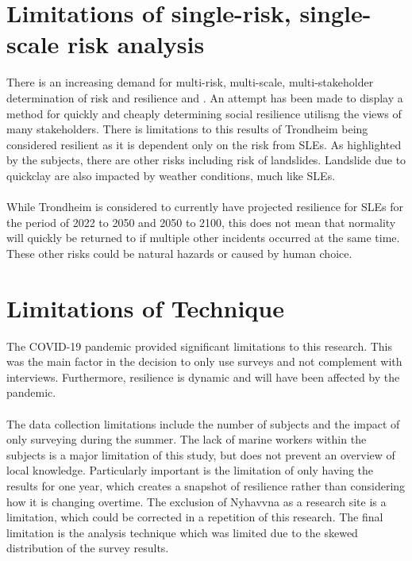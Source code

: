 \section{Limitations of single-risk, single-scale risk analysis}
There is an increasing demand for multi-risk, multi-scale, multi-stakeholder determination of risk and resilience \cite{gerkensmeier_governing_2018} and \cite{cutter_community_2020}. An attempt has been made to display a method for quickly and cheaply determining social resilience utilisng the views of many stakeholders. There is limitations to this results of Trondheim being considered resilient as it is dependent only on the risk from SLEs. As highlighted by the subjects, there are other risks including risk of landslides. Landslide due to quickclay are also impacted by weather conditions, much like SLEs. 
\paragraph{}

While Trondheim is considered to currently have projected resilience for SLEs for the period of 2022 to 2050 and 2050 to 2100, this does not mean that normality will quickly be returned to if multiple other incidents occurred at the same time. These other risks could be natural hazards or caused by human choice. 

\section{Limitations of Technique}
The COVID-19 pandemic provided significant limitations to this research. This was the main factor in the decision to only use surveys and not complement with interviews. Furthermore, resilience is dynamic and will have been affected by the pandemic. 
\paragraph{}
The data collection limitations include the number of subjects and the impact of only surveying during the summer. The lack of marine workers within the subjects is a major limitation of this study, but does not prevent an overview of local knowledge. Particularly important is the limitation of only having the results for one year, which creates a snapshot of resilience rather than considering how it is changing overtime.  The exclusion of Nyhavvna as a research site is a limitation, which could be corrected in a repetition of this research.  The final limitation is the analysis technique which was limited due to the skewed distribution of the survey results.




